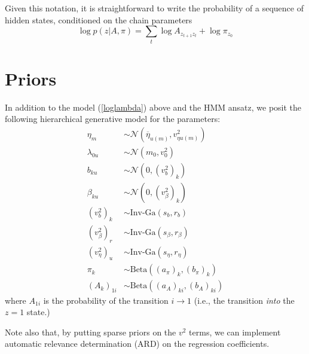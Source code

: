 \documentclass[11pt]{article}
\begin{document}
Given this notation, it is straightforward to write the probability of a sequence of hidden states, conditioned on the chain parameters
\begin{equation}
    \log p(z|A, \pi) = \sum_t \log A_{z_{t+1} z_t} + \log \pi_{z_0}
\end{equation}

\section{Priors}
In addition to the model (\ref{loglambda}) above and the HMM ansatz, we posit the following hierarchical generative model for the parameters:
\begin{align}
    \eta_m &\sim \mathcal{N}(\overline{\eta}_{u(m)}, v^2_{\eta u(m)}) \\
    \lambda_{0u} &\sim \mathcal{N}(m_0, v^2_0) \\
    b_{ku} &\sim \mathcal{N}\left(0, (v^2_b)_{k}\right) \\
    \beta_{ku} &\sim \mathcal{N}\left(0, (v^2_\beta)_{k}\right) \\
    (v^2_b)_{k} &\sim \text{Inv-Ga}\left(s_b, r_b \right) \\
    (v^2_\beta)_{r} &\sim \text{Inv-Ga}\left(s_\beta, r_\beta \right) \\
    (v^2_\eta)_{u} &\sim \text{Inv-Ga}\left(s_\eta, r_\eta \right) \\
    \pi_k &\sim \mathrm{Beta}\left((a_\pi)_k, (b_\pi)_k \right) \\ 
    \left(A_k \right)_{1i} &\sim \mathrm{Beta}\left((a_A)_{ki}, (b_A)_{ki} \right)  
    \end{align}
where $A_{1i}$ is the probability of the transition $i \rightarrow 1$ (i.e., the transition \emph{into} the $z = 1$ state.)

Note also that, by putting sparse priors on the $v^2$ terms, we can implement automatic relevance determination (ARD) on the regression coefficients.
\end{document}
